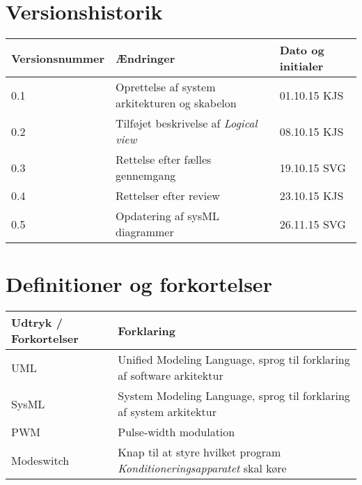 	\section{Versionshistorik}
	\begin{longtable}{ |p{} |p{}| p{}|  } 
		\hline
		\rowcolor{usDef}
		\textbf{Versionsnummer} &  \textbf{Ændringer} & \textbf{Dato og initialer} \\
		\hline
		0.1 &  Oprettelse af system arkitekturen og skabelon & 01.10.15 KJS \\
		\hline
		0.2 & Tilføjet beskrivelse af \textit{Logical view} & 08.10.15 KJS \\
		\hline
		0.3 & Rettelse efter fælles gennemgang & 19.10.15 SVG \\
		\hline
		0.4 & Rettelser efter review & 23.10.15 KJS \\
		\hline
		0.5 & Opdatering af sysML diagrammer  & 26.11.15 SVG \\
		\hline
	\end{longtable}

	\section{Definitioner og forkortelser}
	\begin{longtable}{ |p{} |p{}| } 
		\hline
		\rowcolor{usDef}
		\textbf{Udtryk / Forkortelser} &  \textbf{Forklaring} \\
		\hline
		UML & Unified Modeling Language, sprog til forklaring af software arkitektur \\
		\hline
		SysML & System Modeling Language, sprog til forklaring af system arkitektur \\
		\hline
		PWM & Pulse-width modulation \\
		\hline
		Modeswitch & Knap til at styre hvilket program \textit{Konditioneringsapparatet} skal køre \\
		\hline
	\end{longtable}